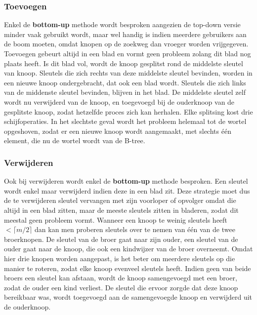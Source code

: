 \documentclass{report}
\begin{document}
	\subsubsection{Toevoegen}
	Enkel de \textbf{bottom-up} methode wordt besproken aangezien de top-down versie minder vaak gebruikt wordt, maar wel handig is indien meerdere gebruikers aan de boom moeten, omdat knopen op de zoekweg dan vroeger worden vrijgegeven. Toevoegen gebeurt altijd in een blad en vormt geen probleem zolang dit blad nog plaats heeft. Is dit blad vol, wordt de knoop gesplitst rond de middelste sleutel van knoop. Sleutels die zich rechts van deze middelste sleutel bevinden, worden in een nieuwe knoop ondergebracht, dat ook een blad wordt. Sleutels die zich links van de middenste sleutel bevinden, blijven in het blad. De middelste sleutel zelf wordt nu verwijderd van de knoop, en toegevoegd bij de ouderknoop van de gesplitste knoop, zodat hetzelfde proces zich kan herhalen. Elke splitsing kost drie schijfoperaties. In het slechtste geval wordt het probleem helemaal tot de wortel opgeshoven, zodat er een nieuwe knoop wordt aangemaakt, met slechts één element, die nu de wortel wordt van de B-tree.
	\subsubsection{Verwijderen}
	Ook bij verwijderen wordt enkel de \textbf{bottom-up} methode besproken. Een sleutel wordt enkel maar verwijderd indien deze in een blad zit. Deze strategie moet dus de te verwijderen sleutel vervangen met zijn voorloper of opvolger omdat die altijd in een blad zitten, maar de meeste sleutels zitten in bladeren, zodat dit meestal geen probleem vormt. Wanneer een knoop te weinig sleutels heeft $< \lceil m/2 \rceil$ dan kan men proberen sleutels over te nemen van één van de twee broerknopen. De sleutel van de broer gaat naar zijn ouder, een sleutel van de ouder gaat naar de knoop, die ook een kindwijzer van de broer overneemt. Omdat hier drie knopen worden aangepast, is het beter om meerdere sleutels op die manier te roteren, zodat elke knoop evenveel sleutels heeft. Indien geen van beide broers een sleutel kan afstaan, wordt de knoop samengevoegd met een broer, zodat de ouder een kind verliest. De sleutel die ervoor zorgde dat deze knoop bereikbaar was, wordt toegevoegd aan de samengevoegde knoop en verwijderd uit de ouderknoop.
\end{document}
